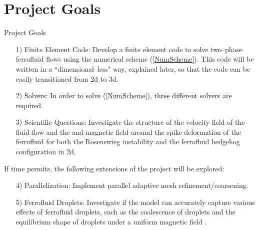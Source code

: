 \documentclass[9pt]{beamer}
\begin{document}
\section{Project Goals}
\begin{frame}{Project Goals}
	\begin{itemize}
		\item[1)] Finite Element Code: Develop a finite element code to solve two--phase ferrofluid flows using the numerical scheme (\ref{NumScheme}). This code will be written in a ``dimensional--less" way, explained later, so that the code can be easily transitioned from 2d to 3d.
		
		\item[2)] Solvers: In order to solve (\ref{NumScheme}), three different solvers are required.
		
		\item[3)] Scientific Questions: Investigate the structure of the velocity field of the fluid flow and the and magnetic field around the spike deformation of the ferrofluid for both the Rosenswieg instability and the ferrofluid hedgehog configuration in 2d.
	\end{itemize}
	If time permits, the following extensions of the project will be explored:
	\begin{itemize}
		\item[4)] Parallelization: Implement parallel adaptive mesh refinement/coarsening.
		
		\item[5)] Ferrofluid Droplets: Investigate if the model can accurately capture various effects of ferrofluid droplets, such as the coalescence of droplets \cite{CompDropplet} and the equilibrium shape of droplets under a uniform magnetic field \cite{DroppletDeform}.
	\end{itemize}
\end{frame}
\end{document}

